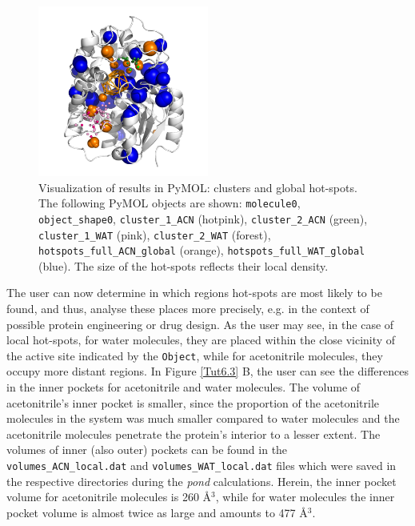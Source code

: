 \documentclass[9pt,tutorial]{livecoms}
\begin{document}
\begin{figure}[ht!]
\centering
\includegraphics[width=0.5\textwidth]{Tut6.4.png}
\caption{Visualization of results in PyMOL: clusters and global hot-spots. The following PyMOL objects are shown: \texttt{molecule0}, \texttt{object\_shape0}, \texttt{cluster\_1\_ACN} (hotpink), \texttt{cluster\_2\_ACN} (green), \texttt{cluster\_1\_WAT} (pink), \texttt{cluster\_2\_WAT} (forest), \texttt{hotspots\_full\_ACN\_global} (orange), \texttt{hotspots\_full\_WAT\_global} (blue). The size of the hot-spots reflects their local density.}
\label{Tut6.4}
\end{figure}

The user can now determine in which regions hot-spots are most likely to be found, and thus, analyse these places more precisely, e.g. in the context of possible protein engineering or drug design. As the user may see, in the case of local hot-spots, for water molecules, they are placed within the close vicinity of the active site indicated by the \texttt{Object}, while for acetonitrile molecules, they occupy more distant regions.
In Figure \ref{Tut6.3} B, the user can see the differences in the inner pockets for acetonitrile and water molecules. The volume of acetonitrile's inner pocket is smaller, since the proportion of the acetonitrile molecules in the system was much smaller compared to water molecules and the acetonitrile molecules penetrate the protein's interior to a lesser extent. The volumes of inner (also outer) pockets can be found in the \texttt{volumes\_ACN\_local.dat} and \texttt{volumes\_WAT\_local.dat} files which were saved in the respective directories during the \emph{pond} calculations. Herein, the inner pocket volume for acetonitrile molecules is 260 Å\( \displaystyle ^{3}\), while for water molecules the inner pocket volume is almost twice as large and amounts to 477 Å\( \displaystyle ^{3}\).
\end{document}
